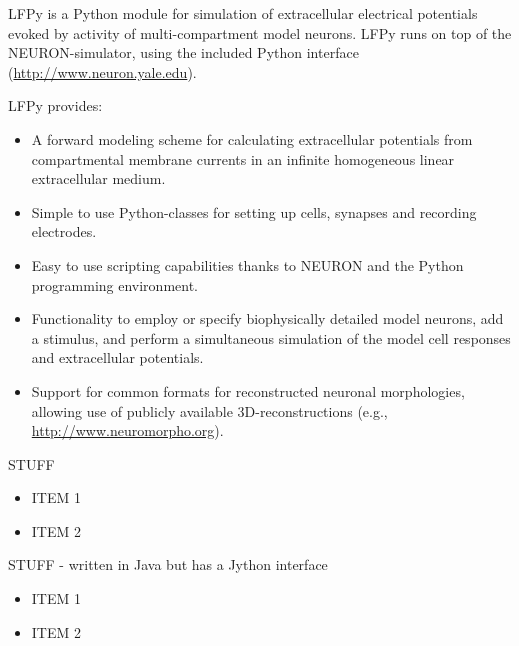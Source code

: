 \begin{multicols}{3}
LFPy is a Python module for simulation of extracellular electrical
potentials evoked by activity of multi-compartment model neurons.
LFPy runs on top of the NEURON-simulator, using the included Python interface
(\url{http://www.neuron.yale.edu}).

LFPy provides:
\begin{itemize}[nolistsep, topsep=0em, leftmargin=1pc]
\item A forward modeling scheme for calculating extracellular potentials from compartmental membrane currents in an infinite homogeneous linear extracellular medium.
\item Simple to use Python-classes for setting up cells, synapses and recording electrodes.
\item Easy to use scripting capabilities thanks to NEURON and the Python programming environment.
\item Functionality to employ or specify biophysically detailed model neurons, add a stimulus, and perform a simultaneous simulation of the model cell responses and extracellular potentials.
\item Support for common formats for reconstructed neuronal morphologies, allowing use of publicly available 3D-reconstructions (e.g., \url{http://www.neuromorpho.org}). 
\end{itemize}


%


STUFF

\begin{itemize}[nolistsep,topsep=0em,leftmargin=1pc]
\item ITEM 1
\item ITEM 2
\end{itemize}


STUFF - written in Java but has a Jython interface

\begin{itemize}[nolistsep,topsep=0em,leftmargin=1pc]
\item ITEM 1
\item ITEM 2
\end{itemize}


\end{multicols}

